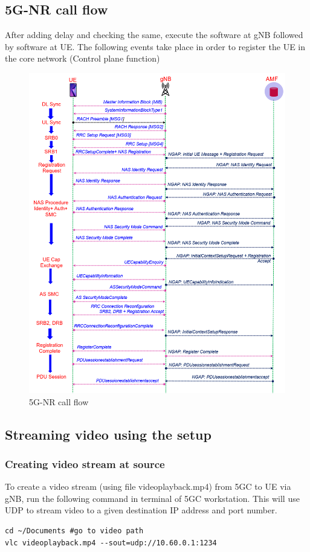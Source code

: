 \subsection{5G-NR call flow}
After adding delay and checking the same, execute the software at gNB followed by software at UE. The following events take place in order to register the UE in the core network (Control plane function)~\cite{3GPP_23_502}
\begin{figure}[h!]
\centering
\includegraphics[width=0.9\columnwidth]{./Figures/5G_Call_Flow.png}
\caption{5G-NR call flow}
\label{5G_Call_Flow}
\end{figure}

\subsection{Streaming video using the setup}
\subsubsection{Creating video stream at source}
To create a video stream (using file videoplayback.mp4) from 5GC to UE via gNB, run the following command in terminal of 5GC workstation. This will use UDP to stream video to a given destination IP address and port number.~\cite{VLC}
\begin{lstlisting}
cd ~/Documents #go to video path
vlc videoplayback.mp4 --sout=udp://10.60.0.1:1234
\end{lstlisting}
